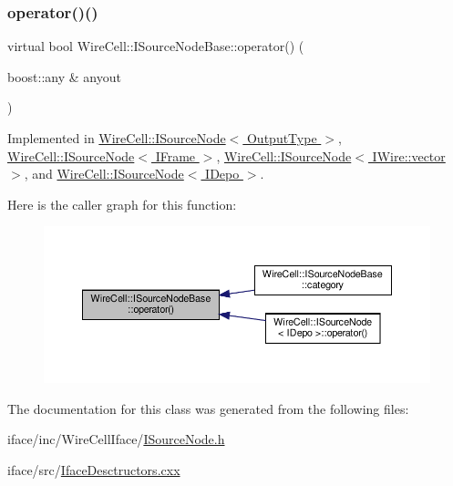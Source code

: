\subsubsection{\texorpdfstring{operator()()}{operator()()}}
{\footnotesize\ttfamily virtual bool Wire\+Cell\+::\+I\+Source\+Node\+Base\+::operator() (\begin{DoxyParamCaption}\item[{boost\+::any \&}]{anyout }\end{DoxyParamCaption})\hspace{0.3cm}{\ttfamily [pure virtual]}}



Implemented in \hyperlink{class_wire_cell_1_1_i_source_node_a4d3f01222148f2787b6097cf8c8e1905}{Wire\+Cell\+::\+I\+Source\+Node$<$ Output\+Type $>$}, \hyperlink{class_wire_cell_1_1_i_source_node_a4d3f01222148f2787b6097cf8c8e1905}{Wire\+Cell\+::\+I\+Source\+Node$<$ I\+Frame $>$}, \hyperlink{class_wire_cell_1_1_i_source_node_a4d3f01222148f2787b6097cf8c8e1905}{Wire\+Cell\+::\+I\+Source\+Node$<$ I\+Wire\+::vector $>$}, and \hyperlink{class_wire_cell_1_1_i_source_node_a4d3f01222148f2787b6097cf8c8e1905}{Wire\+Cell\+::\+I\+Source\+Node$<$ I\+Depo $>$}.

Here is the caller graph for this function\+:
\nopagebreak
\begin{figure}[H]
\begin{center}
\leavevmode
\includegraphics[width=350pt]{class_wire_cell_1_1_i_source_node_base_a6d29d551ab4e4b8479a062dfaa38f42f_icgraph}
\end{center}
\end{figure}


The documentation for this class was generated from the following files\+:\begin{DoxyCompactItemize}
\item 
iface/inc/\+Wire\+Cell\+Iface/\hyperlink{_i_source_node_8h}{I\+Source\+Node.\+h}\item 
iface/src/\hyperlink{_iface_desctructors_8cxx}{Iface\+Desctructors.\+cxx}\end{DoxyCompactItemize}
